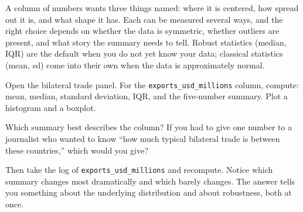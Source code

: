 \documentclass[
  letterpaper,
  11pt,
  twoside,
  openany]{scrbook}
\begin{document}
\begin{tcolorbox}[enhanced jigsaw, arc=.35mm, bottomrule=.15mm, bottomtitle=1mm, breakable, colback=white, colbacktitle=quarto-callout-warning-color!10!white, colframe=quarto-callout-warning-color-frame, coltitle=black, left=2mm, leftrule=.75mm, opacityback=0, opacitybacktitle=0.6, rightrule=.15mm, title=\textcolor{quarto-callout-warning-color}{\faExclamationTriangle}\hspace{0.5em}{Key insight}, titlerule=0mm, toprule=.15mm, toptitle=1mm]

A column of numbers wants three things named: where it is centered, how
spread out it is, and what shape it has. Each can be measured several
ways, and the right choice depends on whether the data is symmetric,
whether outliers are present, and what story the summary needs to tell.
Robust statistics (median, IQR) are the default when you do not yet know
your data; classical statistics (mean, sd) come into their own when the
data is approximately normal.

\end{tcolorbox}

\begin{tcolorbox}[enhanced jigsaw, arc=.35mm, bottomrule=.15mm, bottomtitle=1mm, breakable, colback=white, colbacktitle=quarto-callout-tip-color!10!white, colframe=quarto-callout-tip-color-frame, coltitle=black, left=2mm, leftrule=.75mm, opacityback=0, opacitybacktitle=0.6, rightrule=.15mm, title=\textcolor{quarto-callout-tip-color}{\faLightbulb}\hspace{0.5em}{Try this}, titlerule=0mm, toprule=.15mm, toptitle=1mm]

Open the bilateral trade panel. For the \texttt{exports\_usd\_millions}
column, compute: mean, median, standard deviation, IQR, and the
five-number summary. Plot a histogram and a boxplot.

Which summary best describes the column? If you had to give one number
to a journalist who wanted to know ``how much typical bilateral trade is
between these countries,'' which would you give?

Then take the log of \texttt{exports\_usd\_millions} and recompute.
Notice which summary changes most dramatically and which barely changes.
The answer tells you something about the underlying distribution and
about robustness, both at once.

\end{tcolorbox}
\end{document}
